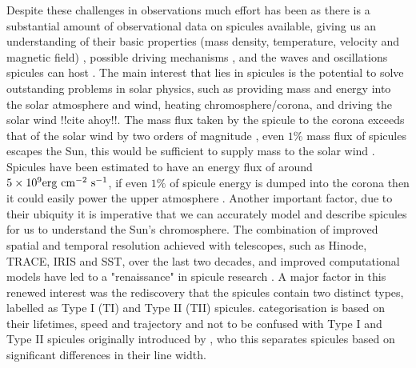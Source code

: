 \documentclass[12pt]{ociamthesis}
\newcommand{\np}{\\ \\}
\begin{document}
Despite these challenges in observations much effort has been as there is a substantial amount of observational data on spicules available, giving us an understanding of their basic properties (mass density, temperature, velocity and magnetic field) \citep[see reviews:][]{Beckers1968, Beckers1972ARA&A}, possible driving mechanisms \citep[see review:][]{Sterling_2000SoPh}, and the waves and oscillations spicules can host \citep[see review:][]{Zaqarashvili_2009SSRv}. The main interest that lies in spicules is the potential to solve outstanding problems in solar physics, such as providing mass and energy into the solar atmosphere and wind, heating chromosphere/corona, and driving the solar wind \citep{Pontieu2011Sci, Moore2011ApJ731L18M, Henriques2016, Samanta2019Sci} {\color{green} !!cite ahoy!!}. The mass flux taken by the spicule to the corona exceeds that of the solar wind by two orders of magnitude \citep{Thomas1961}, even $1\%$ mass flux of spicules escapes the Sun, this would be sufficient to supply mass to the solar wind \citep{Pneuman1977AA55305P, Pneuman1978SoPh5749P, Tian2014Sci346A315T, Samanta2015ApJ815L16S}. Spicules have been estimated to have an energy flux of around $5\times10^9\rm{erg~cm^{-2}~s^{-1}}$, if even $1\%$ of spicule energy is dumped into the corona then it could easily power the upper atmosphere \citep{Zaqarashvili_2009SSRv}. Another important factor, due to their ubiquity it is imperative that we can accurately model and describe spicules for us to understand the Sun's chromosphere. The combination of improved spatial and temporal resolution achieved with telescopes, such as Hinode, TRACE, IRIS and SST, over the last two decades, and improved computational models have led to a "renaissance" in spicule research \citep{Aschwanden2019ASSL}. A major factor in this renewed interest was the rediscovery that the spicules contain two distinct types, labelled as Type I (TI) and Type II (TII) spicules. \citep{Pontieu2007PASJ} categorisation is based on their lifetimes, speed and trajectory and not to be confused with Type I and Type II spicules originally introduced by \cite{Beckers1968}, who this separates spicules based on significant differences in their line width. \np
\end{document}
